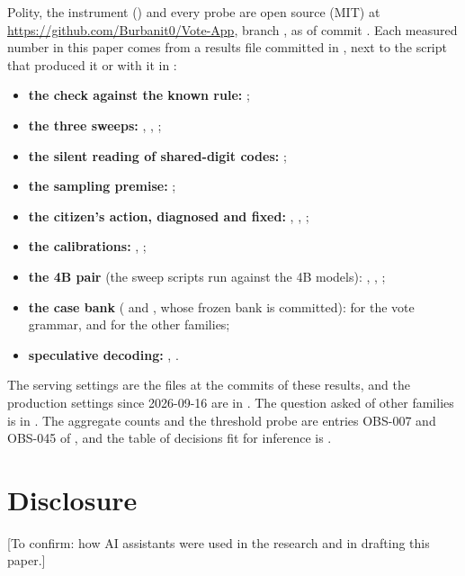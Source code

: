 \documentclass[11pt]{article}
\begin{document}
Polity, the instrument () and every probe are open source
(MIT) at \url{https://github.com/Burbanit0/Vote-App}, branch , as of commit
. Each measured number in this paper comes from a results file committed in
, next to the script that produced it or with it in
:
\begin{itemize}
  \item \textbf{the check against the known rule:} ;
  \item \textbf{the three sweeps:} ,
    ,
    ;
  \item \textbf{the silent reading of shared-digit codes:}
    ;
  \item \textbf{the sampling premise:} ;
  \item \textbf{the citizen's action, diagnosed and fixed:}
    ,
    ,
    ;
  \item \textbf{the calibrations:} ,
    ;
  \item \textbf{the 4B pair} (the sweep scripts run against the 4B models):
    , ,
    ;
  \item \textbf{the case bank} ( and , whose frozen
    bank is committed):  for the vote grammar, and
     for the other families;
  \item \textbf{speculative decoding:} ,
    .
\end{itemize}
The serving settings are the  files at the commits
of these results, and the production settings since 2026-09-16 are in
. The question asked of other families is in
. The aggregate counts and the threshold probe
are entries OBS-007 and OBS-045 of , and the table of
decisions fit for inference is .
\par\endgroup

\section*{Disclosure}

[To confirm: how AI assistants were used in the research and in drafting this paper.]



\end{document}
